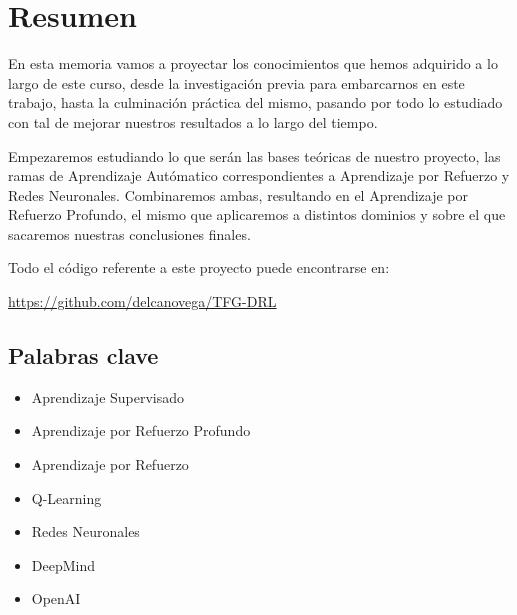 \chapter*{Resumen}

En esta memoria vamos a proyectar los conocimientos que hemos adquirido a lo largo de este curso, desde la investigación previa para embarcarnos en este trabajo, hasta la culminación práctica del mismo, pasando por todo lo estudiado con tal de mejorar nuestros resultados a lo largo del tiempo.

Empezaremos estudiando lo que serán las bases teóricas de nuestro proyecto, las ramas de Aprendizaje Autómatico correspondientes a Aprendizaje por Refuerzo y Redes Neuronales. Combinaremos ambas, resultando en el Aprendizaje por Refuerzo Profundo, el mismo que aplicaremos a distintos dominios y sobre el que sacaremos nuestras conclusiones finales.

Todo el código referente a este proyecto puede encontrarse en:

\url{https://github.com/delcanovega/TFG-DRL}

\section*{Palabras clave}
   
\begin{itemize}
    \item Aprendizaje Supervisado
    \item Aprendizaje por Refuerzo Profundo
    \item Aprendizaje por Refuerzo
    \item Q-Learning
    \item Redes Neuronales
    \item DeepMind 
    \item OpenAI
\end{itemize}